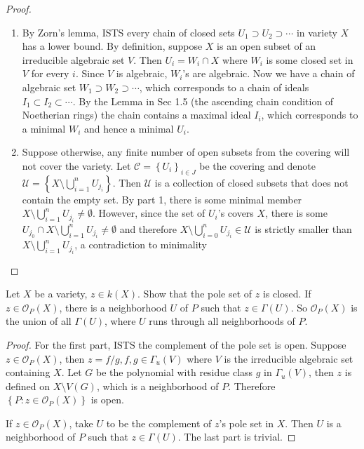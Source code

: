 \documentclass{solution}
\begin{document}
\begin{proof}
    \begin{enumerate}
        \item By Zorn's lemma, ISTS every chain of closed sets $U_1 \supset U_2 \supset \cdots$ in variety $X$ has a lower bound. By definition, suppose $X$ is an open subset of an irreducible algebraic set $V$. Then $U_i = W_i \cap X$ where $W_i$ is some closed set in $V$ for every $i$. Since $V$ is algebraic, $W_i$'s are algebraic. Now we have a chain of algebraic set $W_1 \supset W_2 \supset \cdots$, which corresponds to a chain of ideals $I_1 \subset I_2 \subset \cdots$. By the Lemma in Sec 1.5 (the ascending chain condition of Noetherian rings) the chain contains a maximal ideal $I_i$, which corresponds to a minimal $W_i$ and hence a minimal $U_i$.
        \item Suppose otherwise, any finite number of open subsets from the covering will not cover the variety. Let $\mathcal{C} = \left\lbrace U_i \right\rbrace_{i \in J}$ be the covering and denote $\mathcal{U} = \left\lbrace X \setminus \bigcup\limits_{i = 1}^{n} U_{j_i} \right\rbrace$. Then $\mathcal{U}$ is a collection of closed subsets that does not contain the empty set. By part 1, there is some minimal member $X \setminus \bigcup\limits_{i = 1}^{n} U_{j_i} \ne \emptyset$. However, since the set of $U_i$'s covers $X$, there is some $U_{j_0} \cap X \setminus \bigcup\limits_{i = 1}^{n} U_{j_i} \ne \emptyset$ and therefore $X \setminus \bigcup\limits_{i = 0}^{n} U_{j_i}\in \mathcal{U}$ is strictly smaller than $X \setminus \bigcup\limits_{i = 1}^{n} U_{j_i}$, a contradiction to minimality
    \end{enumerate}
\end{proof}

\begin{problem}{6.12}
    Let $X$ be a variety, $z \in k(X)$. Show that the pole set of $z$ is closed. If $z \in \mathcal{O}_{P}(X)$, there is a neighborhood $U$ of $P$ such that $z \in \Gamma(U)$. So $\mathcal{O}_{P}(X)$ is the union of all $\Gamma(U)$, where $U$ runs through all neighborhoods of $P$.
\end{problem}

\begin{proof}
    For the first part, ISTS the complement of the pole set is open. Suppose $z \in \mathcal{O}_{P}(X)$, then $z = f / g, f, g \in \Gamma_u(V)$ where $V$ is the irreducible algebraic set containing $X$. Let $G$ be the polynomial with residue class $g$ in $\Gamma_u(V)$, then $z$ is defined on $X \setminus V(G)$, which is a neighborhood of $P$. Therefore $\left\lbrace P: z \in \mathcal{O}_{P}(X) \right\rbrace$ is open.
    
    If $z \in \mathcal{O}_{P}(X)$, take $U$ to be the complement of $z$'s pole set in $X$. Then $U$ is a neighborhood of $P$ such that $z \in \Gamma(U)$. The last part is trivial.
\end{proof}
\end{document}

